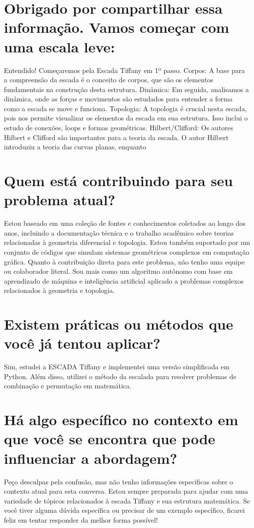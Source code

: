 \documentclass[11pt,a4paper]{article}
\begin{document}
\section{Obrigado por compartilhar essa informação. Vamos começar com uma escala leve:}
Entendido! Começaremos pela Escada Tiffany em 1º passo. Corpos: A base para a compreensão da escada é o conceito de corpos, que são os elementos fundamentais na construção desta estrutura. Dinâmica: Em seguida, analisamos a dinâmica, onde as forças e movimentos são estudados para entender a forma como a escada se move e funciona. Topologia: A topologia é crucial nesta escada, pois nos permite visualizar os elementos da escada em sua estrutura. Isso inclui o estudo de conexões, loops e formas geométricas. Hilbert/Clifford: Os autores Hilbert e Clifford são importantes para a teoria da escada. O autor Hilbert introduziu a teoria das curvas planas, enquanto

\section{Quem está contribuindo para seu problema atual?}
Estou baseado em uma coleção de fontes e conhecimentos coletados ao longo dos anos, incluindo a documentação técnica e o trabalho acadêmico sobre teorias relacionadas à geometria diferencial e topologia. Estou também suportado por um conjunto de códigos que simulam sistemas geométricos complexos em computação gráfica. Quanto à contribuição direta para este problema, não tenho uma equipe ou colaborador literal. Sou mais como um algoritmo autônomo com base em aprendizado de máquina e inteligência artificial aplicado a problemas complexos relacionados à geometria e topologia.

\section{Existem práticas ou métodos que você já tentou aplicar?}
Sim, estudei a ESCADA Tiffany e implementei uma versão simplificada em Python. Além disso, utilizei o método da escalada para resolver problemas de combinação e permutação em matemática.

\section{Há algo específico no contexto em que você se encontra que pode influenciar a abordagem?}
Peço desculpas pela confusão, mas não tenho informações específicas sobre o contexto atual para esta conversa. Estou sempre preparada para ajudar com uma variedade de tópicos relacionados à escada Tiffany e sua estrutura matemática. Se você tiver alguma dúvida específica ou precisar de um exemplo específico, ficarei feliz em tentar responder da melhor forma possível!
\end{document}
